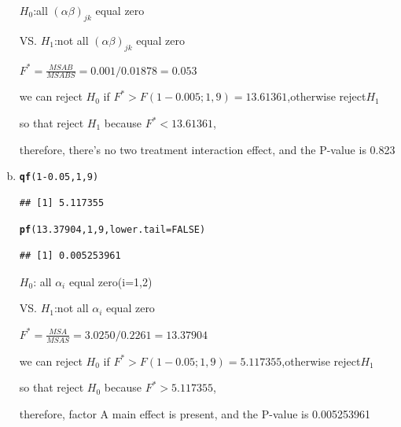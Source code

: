 \documentclass{article}\usepackage[]{graphicx}\usepackage[]{color}
\makeatletter
\newcommand{\hlnum}[1]{\textcolor[rgb]{0.686,0.059,0.569}{#1}}%
\newcommand{\hlopt}[1]{\textcolor[rgb]{0,0,0}{#1}}%
\newcommand{\hlstd}[1]{\textcolor[rgb]{0.345,0.345,0.345}{#1}}%
\newcommand{\hlkwc}[1]{\textcolor[rgb]{0.333,0.667,0.333}{#1}}%
\newcommand{\hlkwd}[1]{\textcolor[rgb]{0.737,0.353,0.396}{\textbf{#1}}}%
\newenvironment{kframe}{%
 \def\at@end@of@kframe{}%
 \ifinner\ifhmode%
  \def\at@end@of@kframe{\end{minipage}}%
  \begin{minipage}{\columnwidth}%
 \fi\fi%
 \def\FrameCommand##1{\hskip\@totalleftmargin \hskip-\fboxsep
 \colorbox{shadecolor}{##1}\hskip-\fboxsep
     \hskip-\linewidth \hskip-\@totalleftmargin \hskip\columnwidth}%
 \MakeFramed {\advance\hsize-\width
   \@totalleftmargin\z@ \linewidth\hsize
   \@setminipage}}%
 {\par\unskip\endMakeFramed%
 \at@end@of@kframe}
\newenvironment{knitrout}{}{} %
\makeatother
\begin{document}
\begin{enumerate}[(a)]
\begin{center}
$H_0$:all $(\alpha\beta)_{jk}$ equal zero

VS. $H_1$:not all $(\alpha\beta)_{jk}$ equal zero

$F^*=\frac{MSAB}{MSABS} = 0.001/0.01878  = 0.053$

we can reject $H_0$ if $F^* > F(1-0.005;1,9)=13.61361$,otherwise reject$H_1$

so that reject $H_1$ because $F^*<13.61361$,

therefore, there's no two treatment interaction effect, and the P-value is 0.823
\end{center}

\item

\begin{knitrout}
\color{fgcolor}\begin{kframe}
\begin{alltt}
  \hlkwd{qf}\hlstd{(}\hlnum{1}\hlopt{-}\hlnum{0.05}\hlstd{,} \hlnum{1}\hlstd{,} \hlnum{9}\hlstd{)}
\end{alltt}
\begin{verbatim}
## [1] 5.117355
\end{verbatim}
\begin{alltt}
  \hlkwd{pf}\hlstd{(}\hlnum{13.37904}\hlstd{,} \hlnum{1}\hlstd{,} \hlnum{9}\hlstd{,} \hlkwc{lower.tail} \hlstd{=} \hlnum{FALSE}\hlstd{)}
\end{alltt}
\begin{verbatim}
## [1] 0.005253961
\end{verbatim}
\end{kframe}
\end{knitrout}

\begin{center}
$H_0$: all $\alpha_i$ equal zero(i=1,2)

VS. $H_1$:not all $\alpha_i$ equal zero

$F^*=\frac{MSA}{MSAS} = 3.0250/0.2261  = 13.37904$

we can reject $H_0$ if $F^* > F(1-0.05;1,9)=5.117355$,otherwise reject$H_1$

so that reject $H_0$ because $F^*>5.117355$,

therefore, factor A main effect is present, and the P-value is 0.005253961
\end{center}


\end{enumerate}
\end{document}
